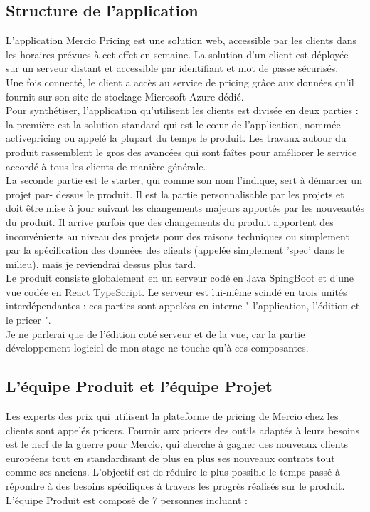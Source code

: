 \documentclass{rapportCS}
\begin{document}
\subsection{Structure de l'application}
L'application Mercio Pricing est une solution web, accessible par les clients dans les horaires 
prévues à cet effet en semaine. La solution d'un client est déployée sur un serveur distant et 
accessible par identifiant et mot de passe sécurisés.\\
Une fois connecté, le client a accès au service de pricing grâce aux données qu'il fournit sur son 
site de stockage Microsoft Azure dédié.\\
Pour synthétiser, l'application qu'utilisent les clients est divisée en deux parties : 
la première est la solution standard qui est le cœur de l'application, nommée activepricing ou 
appelé la plupart du temps le produit. Les travaux autour du produit rassemblent le gros des avancées 
qui sont faîtes pour améliorer le service accordé à tous les clients de manière générale.\\
La seconde partie est le starter, qui comme son nom l'indique, sert à démarrer un projet par- 
dessus le produit. Il est la partie personnalisable par les projets et doit être mise à jour suivant
les changements majeurs apportés par les nouveautés du produit. Il arrive parfois que des 
changements du produit apportent des inconvénients au niveau des projets pour des raisons techniques
ou simplement par la spécification des données des clients (appelée simplement 'spec' dans le milieu),
mais je reviendrai dessus plus tard.\\
Le produit consiste globalement en un serveur codé en Java SpingBoot et d'une vue codée en React TypeScript.
Le serveur est lui-même scindé en trois unités interdépendantes : ces parties sont appelées en interne 
" l'application, l'édition et le pricer ".\\ 
Je ne parlerai que de l'édition coté serveur et de la vue, car la partie développement logiciel de mon stage ne
touche qu'à ces composantes.\\

\subsection{ L'équipe Produit et l'équipe Projet }
Les experts des prix qui utilisent la plateforme de pricing de Mercio chez les clients sont appelés 
pricers. Fournir aux pricers des outils adaptés à leurs besoins est le nerf de la guerre pour 
Mercio, qui cherche à gagner des nouveaux clients européens tout en standardisant de plus 
en plus ses nouveaux contrats tout comme ses anciens. 
L'objectif est de réduire le plus possible le temps passé à répondre à des besoins spécifiques 
à travers les progrès réalisés sur le produit.\\
L'équipe Produit est composé de 7 personnes incluant :\\
\end{document}
